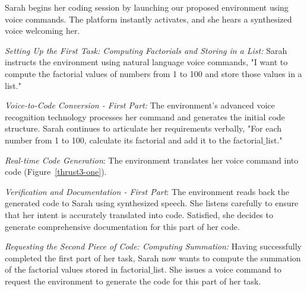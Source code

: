 

 Sarah begins her coding
session by launching our proposed environment using voice
commands. The platform instantly activates, and she hears a
synthesized voice welcoming her.

{\em Setting Up the First Task: Computing Factorials and Storing in a
  List:} Sarah instructs the environment using natural language voice
commands, "I want to compute the factorial values of numbers from 1 to
100 and store those values in a list."

{\em Voice-to-Code Conversion - First Part:} The environment's
advanced voice recognition technology processes her command and
generates the initial code structure. Sarah continues to articulate
her requirements verbally, "For each number from 1 to 100, calculate
its factorial and add it to the factorial$\_$list."

{\em Real-time Code Generation}:
The environment translates her voice command into code (Figure~\ref{thrust3-one}).

{\em Verification and Documentation - First Part}: The environment
reads back the generated code to Sarah using synthesized speech. She
listens carefully to ensure that her intent is accurately translated
into code. Satisfied, she decides to generate comprehensive
documentation for this part of her code.


{\em Requesting the Second Piece of Code: Computing Summation:} Having
successfully completed the first part of her task, Sarah now wants to
compute the summation of the factorial values stored in
factorial$\_$list. She issues a voice command to request the environment
to generate the code for this part of her task.


